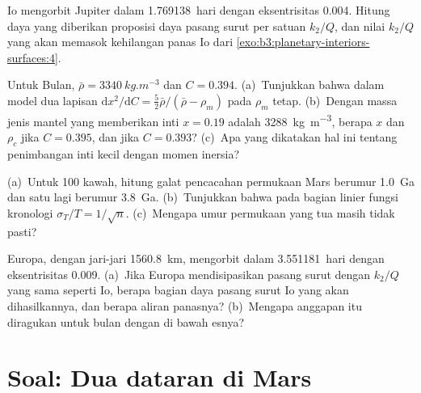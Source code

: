 \begin{exercise}[$\star\star$]\label{exo:b3:planetary-interiors-surfaces:9}
Io mengorbit Jupiter dalam \num{1.769138}~hari dengan eksentrisitas 0.004.
Hitung daya yang diberikan proposisi daya pasang surut per satuan $k_2/Q$,
dan nilai $k_2/Q$ yang akan memasok kehilangan panas Io dari
\cref{exo:b3:planetary-interiors-surfaces:4}.
\end{exercise}

\begin{exercise}[$\star\star\star$]\label{exo:b3:planetary-interiors-surfaces:10}
Untuk Bulan, $\bar\rho = \qty{3340}{kg.m^{-3}}$ dan $C = 0.394$.
(a)~Tunjukkan bahwa dalam model dua lapisan $\mathrm dx^2/\mathrm dC =
\tfrac52\bar\rho/(\bar\rho - \rho_m)$ pada $\rho_m$ tetap. (b)~Dengan
massa jenis mantel yang memberikan inti $x = 0.19$ adalah \qty{3288}{kg.m^{-3}},
berapa $x$ dan $\rho_c$ jika $C = 0.395$, dan jika $C = 0.393$?
(c)~Apa yang dikatakan hal ini tentang penimbangan inti kecil dengan momen
inersia?
\end{exercise}

\begin{exercise}[$\star\star\star$]\label{exo:b3:planetary-interiors-surfaces:11}
(a)~Untuk 100 kawah, hitung galat pencacahan 
permukaan Mars berumur \qty{1.0}{Ga} dan satu lagi berumur \qty{3.8}{Ga}.
(b)~Tunjukkan bahwa pada bagian linier fungsi kronologi $\sigma_T/T =
1/\sqrt n$. (c)~Mengapa umur permukaan yang tua masih tidak pasti?
\end{exercise}

\begin{exercise}[$\star\star\star$]\label{exo:b3:planetary-interiors-surfaces:12}
Europa, dengan jari-jari \qty{1560.8}{km}, mengorbit dalam \num{3.551181}~hari dengan
eksentrisitas 0.009. (a)~Jika Europa mendisipasikan pasang surut dengan $k_2/Q$ yang sama
seperti Io, berapa bagian daya pasang surut Io yang akan dihasilkannya, dan berapa aliran panasnya?
(b)~Mengapa anggapan itu diragukan untuk bulan dengan  di bawah esnya?
\end{exercise}

\section{Soal: Dua dataran di Mars}

